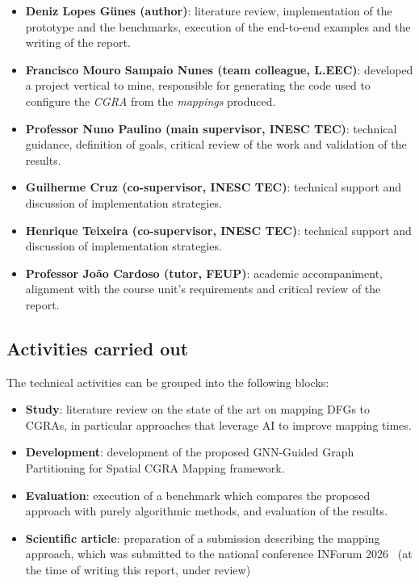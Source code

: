 \documentclass[10pt]{article}
\begin{document}
\begin{itemize}
	\item \textbf{Deniz Lopes Günes (author)}: literature review,
	      implementation of the prototype and the benchmarks, execution of the end-to-end examples and the writing of the report.
	\item \textbf{Francisco Mouro Sampaio Nunes (team colleague, L.EEC)}: developed a project vertical to mine, responsible for generating the code
	      used to configure the \textit{CGRA} from the \textit{mappings} produced.
	\item \textbf{Professor Nuno Paulino (main supervisor, INESC TEC)}: technical guidance, definition of goals, critical review of the work and validation of the results.
	\item \textbf{Guilherme Cruz (co-supervisor, INESC TEC)}: technical support and discussion of implementation strategies.
	\item \textbf{Henrique Teixeira (co-supervisor, INESC TEC)}: technical support and discussion of implementation strategies.
	\item \textbf{Professor João Cardoso (tutor, FEUP)}: academic
	      accompaniment, alignment with the course unit's requirements and
	      critical review of the report.
\end{itemize}

\subsection{Activities carried out}

The technical activities can be grouped into the following blocks:

\begin{itemize}
	\item \textbf{Study}: literature review on the state of the art on mapping DFGs to CGRAs, in particular approaches that leverage AI to improve mapping times.
	\item \textbf{Development}: development of the proposed GNN-Guided Graph Partitioning for Spatial CGRA Mapping framework.
	\item \textbf{Evaluation}: execution of a benchmark which compares the proposed approach with purely algorithmic methods, and evaluation of the results.
	\item \textbf{Scientific article}: preparation of a submission describing the mapping approach, which was submitted to the national conference INForum 2026~\cite{inforum2026} (at the time of writing this report, under review)
\end{itemize}
\end{document}
